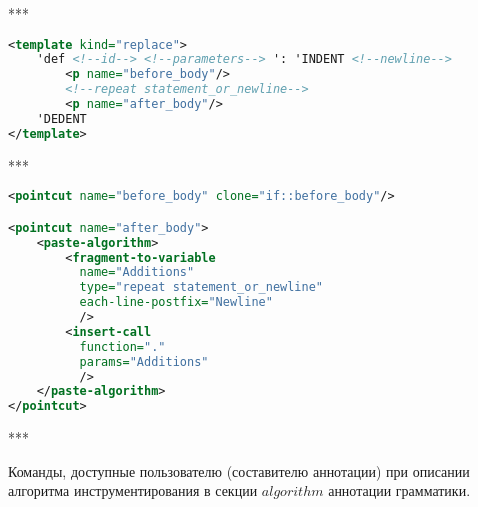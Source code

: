 ***

\begin{lstlisting}[frame=single, language=XML, label={annotation-template-example}, caption={Пример}]
<template kind="replace">
    'def <!--id--> <!--parameters--> ': 'INDENT <!--newline-->
        <p name="before_body"/>
        <!--repeat statement_or_newline-->
        <p name="after_body"/>
    'DEDENT
</template>
\end{lstlisting}

***

\begin{lstlisting}[frame=single, language=XML, label={annotation-algo-example}, caption={Пример}]
<pointcut name="before_body" clone="if::before_body"/>

<pointcut name="after_body">
    <paste-algorithm>
        <fragment-to-variable
          name="Additions"
          type="repeat statement_or_newline"
          each-line-postfix="Newline"
          />
        <insert-call
          function="."
          params="Additions"
          />
    </paste-algorithm>
</pointcut>
\end{lstlisting}

***

Команды, доступные пользователю (составителю аннотации) при описании алгоритма инструментирования в секции $algorithm$ аннотации грамматики.

